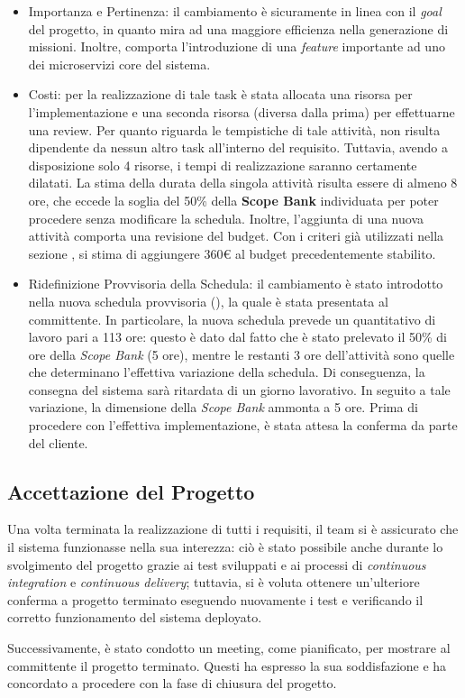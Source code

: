 \begin{itemize}
    \item Importanza e Pertinenza: il cambiamento è sicuramente in linea con il \textit{goal} del progetto, in quanto mira ad una maggiore efficienza nella generazione di missioni. Inoltre, comporta l'introduzione di una \textit{feature} importante ad uno dei microservizi core del sistema.
    \item Costi: per la realizzazione di tale task è stata allocata una risorsa per l'implementazione e una seconda risorsa (diversa dalla prima) per effettuarne una review. Per quanto riguarda le tempistiche di tale attività, non risulta dipendente da nessun altro task all'interno del requisito. Tuttavia, avendo a disposizione solo 4 risorse, i tempi di realizzazione saranno certamente dilatati. La stima della durata della singola attività risulta essere di almeno 8 ore, che eccede la soglia del 50\% della \textbf{Scope Bank} individuata per poter procedere senza modificare la schedula. Inoltre, l'aggiunta di una nuova attività comporta una revisione del budget. Con i criteri già utilizzati nella sezione \label{sec:budget}, si stima di aggiungere 360\euro{} al budget precedentemente stabilito.
    \item Ridefinizione Provvisoria della Schedula: il cambiamento è stato introdotto nella nuova schedula provvisoria (), la quale è stata presentata al committente. In particolare, la nuova schedula prevede un quantitativo di lavoro pari a 113 ore: questo è dato dal fatto che è stato prelevato il 50\% di ore della \textit{Scope Bank} (5 ore), mentre le restanti 3 ore dell'attività sono quelle che determinano l'effettiva variazione della schedula. Di conseguenza, la consegna del sistema sarà ritardata di un giorno lavorativo. In seguito a tale variazione, la dimensione della \textit{Scope Bank} ammonta a 5 ore. Prima di procedere con l'effettiva implementazione, è stata attesa la conferma da parte del cliente.
\end{itemize}

\subsection{Accettazione del Progetto}
Una volta terminata la realizzazione di tutti i requisiti, il team si è assicurato che il sistema funzionasse nella sua interezza: ciò è stato possibile anche durante lo svolgimento del progetto grazie ai test sviluppati e ai processi di \textit{continuous integration} e \textit{continuous delivery}; tuttavia, si è voluta ottenere un'ulteriore conferma a progetto terminato eseguendo nuovamente i test e verificando il corretto funzionamento del sistema deployato.

Successivamente, è stato condotto un meeting, come pianificato, per mostrare al committente il progetto terminato. Questi ha espresso la sua soddisfazione e ha concordato a procedere con la fase di chiusura del progetto.